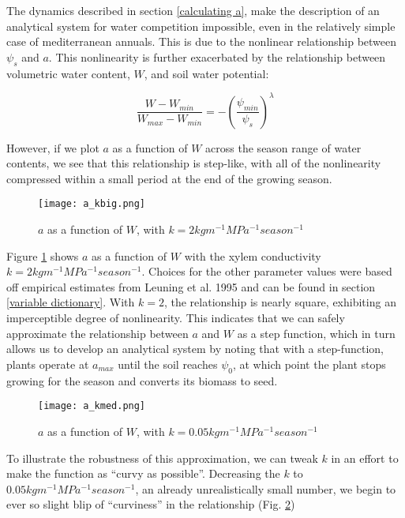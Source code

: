 \documentclass{article}
\begin{document}
  The dynamics described in section \ref{calculating a}, make the description of
  an analytical system for water competition impossible, even in the relatively
  simple case of mediterranean annuals. This is due to the nonlinear
  relationship between $\psi_{s}$ and $a$. This nonlinearity is further
  exacerbated by the relationship between volumetric water content, $W$, and
  soil water potential:

  \begin{equation} \label{Wfun}
    \frac{W - W_{min}}{W_{max} - W_{min}} = - \left( \frac{\psi_{min}}{\psi_{s}} \right)^{\lambda}
  \end{equation}

  However, if we plot $a$ as a function of $W$ across the season range of water
  contents, we see that this relationship is step-like, with all
  of the nonlinearity compressed within a small period at the end of the growing season.

  \begin{figure}[h]
    \caption{$a$ as a function of $W$, with $k = 2 kg m^{-1} MPa^{-1} season^{-1}$}
    \centering
    \texttt{[image: a\_kbig.png]}
    \label{fig:a2}
  \end{figure}

  Figure \ref{fig:a2} shows $a$ as a function of $W$ with the xylem
  conductivity $k = 2 kg m^{-1} MPa^{-1} season^{-1}$. Choices for the other parameter
  values were based off empirical estimates from Leuning et al. 1995 and can be
  found in section \ref{variable dictionary}. With $k = 2$, the relationship is
  nearly square, exhibiting an imperceptible degree of nonlinearity. This
  indicates that we can safely approximate the relationship between $a$ and
  $W$ as a step function, which in turn allows us to develop an analytical
  system by noting that with a step-function, plants operate at $a_{max}$ until the soil reaches
  $\psi_{0}$, at which point the plant stops growing for the season and converts
  its biomass to seed.

  \begin{figure}[h]
    \caption{$a$ as a function of $W$, with $k = 0.05 kg m^{-1} MPa^{-1} season^{-1}$}
    \centering
    \texttt{[image: a\_kmed.png]}
    \label{fig:a0.05}
  \end{figure}

  To illustrate the robustness of this approximation, we can tweak $k$
  in an effort to make the function as ``curvy as possible''. Decreasing
  the $k$ to $0.05 kg m^{-1} MPa^{-1} season^{-1}$, an already unrealistically
  small number, we begin to ever so slight blip of ``curviness'' in the
  relationship (Fig. \ref{fig:a0.05})
\end{document}
